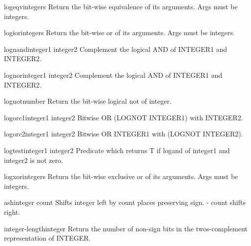 \begin{function}{logeqv}{\rest integers}{}{}
  Return the bit-wise equivalence of its arguments. Args must be integers.
\end{function}

\begin{function}{logior}{\rest integers}{}{}
  Return the bit-wise or of its arguments. Args must be integers.
\end{function}

\begin{function}{lognand}{integer1 integer2}{}{}
  Complement the logical AND of INTEGER1 and INTEGER2.
\end{function}

\begin{function}{lognor}{integer1 integer2}{}{}
  Complement the logical AND of INTEGER1 and INTEGER2.
\end{function}

\begin{function}{lognot}{number}{}{}
  Return the bit-wise logical not of integer.
\end{function}

\begin{function}{logorc1}{integer1 integer2}{}{}
  Bitwise OR (LOGNOT INTEGER1) with INTEGER2.
\end{function}

\begin{function}{logorc2}{integer1 integer2}{}{}
  Bitwise OR INTEGER1 with (LOGNOT INTEGER2).
\end{function}

\begin{function}{logtest}{integer1 integer2}{}{}
  Predicate which returns T if logand of integer1 and integer2 is not zero.
\end{function}

\begin{function}{logxor}{\rest integers}{}{}
  Return the bit-wise exclusive or of its arguments. Args must be integers.
\end{function}

\begin{function}{ash}{integer count}{}{}
  Shifts integer left by count places preserving sign. - count shifts right.
\end{function}

\begin{function}{integer-length}{integer}{}{}
  Return the number of non-sign bits in the twos-complement representation
  of INTEGER.
\end{function}

